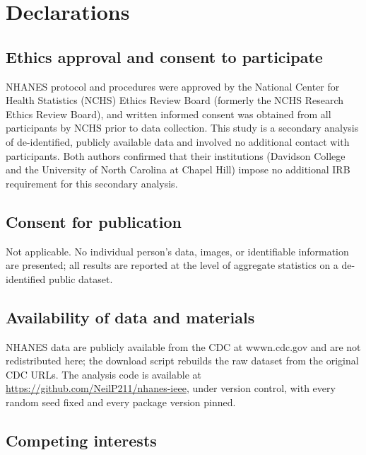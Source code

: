 \documentclass[12pt]{article}
\begin{document}
\clearpage

\doublespacing

\section*{Declarations}

\subsection*{Ethics approval and consent to participate}

NHANES protocol and procedures were approved by the National Center for Health Statistics (NCHS) Ethics Review Board (formerly the NCHS Research Ethics Review Board), and written informed consent was obtained from all participants by NCHS prior to data collection. This study is a secondary analysis of de-identified, publicly available data and involved no additional contact with participants. Both authors confirmed that their institutions (Davidson College and the University of North Carolina at Chapel Hill) impose no additional IRB requirement for this secondary analysis.

\subsection*{Consent for publication}

Not applicable. No individual person's data, images, or identifiable information are presented; all results are reported at the level of aggregate statistics on a de-identified public dataset.

\subsection*{Availability of data and materials}

NHANES data are publicly available from the CDC at wwwn.cdc.gov and are not redistributed here; the download script rebuilds the raw dataset from the original CDC URLs. The analysis code is available at \url{https://github.com/NeilP211/nhanes-ieee}, under version control, with every random seed fixed and every package version pinned.

\subsection*{Competing interests}
\end{document}
